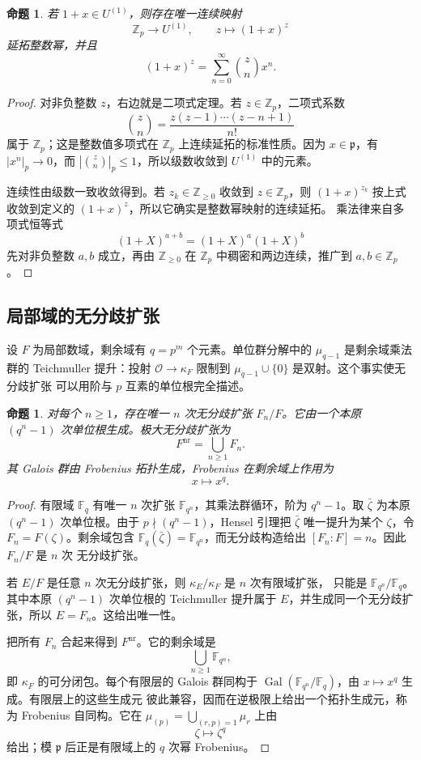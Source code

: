 \documentclass[11pt,a4paper,openany]{ctexbook}
\numberwithin{equation}{chapter}
\newcommand{\Z}{\mathbb{Z}}
\newcommand{\F}{\mathbb{F}}
\theoremstyle{plain}
\newtheorem{proposition}[theorem]{命题}
\theoremstyle{definition}
\theoremstyle{remark}
\begin{document}
\begin{proposition}
若 $1+x\in U^{(1)}$，则存在唯一连续映射
\[
\Z_p\longrightarrow U^{(1)},\qquad z\longmapsto (1+x)^z
\]
延拓整数幂，并且
\[
(1+x)^z=\sum_{n=0}^\infty \binom{z}{n}x^n.
\]
\end{proposition}

\begin{proof}
对非负整数 $z$，右边就是二项式定理。若 $z\in\Z_p$，二项式系数
\[
\binom{z}{n}=\frac{z(z-1)\cdots(z-n+1)}{n!}
\]
属于 $\Z_p$；这是整数值多项式在 $\Z_p$ 上连续延拓的标准性质。因为
$x\in\mathfrak p$，有 $|x^n|_p\to0$，而 $|\binom{z}{n}|_p\le1$，所以级数收敛到
$U^{(1)}$ 中的元素。

连续性由级数一致收敛得到。若 $z_k\in\Z_{\ge0}$ 收敛到 $z\in\Z_p$，则
$(1+x)^{z_k}$ 按上式收敛到定义的 $(1+x)^z$，所以它确实是整数幂映射的连续延拓。
乘法律来自多项式恒等式
\[
(1+X)^{a+b}=(1+X)^a(1+X)^b
\]
先对非负整数 $a,b$ 成立，再由 $\Z_{\ge0}$ 在 $\Z_p$ 中稠密和两边连续，推广到
$a,b\in\Z_p$。
\end{proof}

\subsection{局部域的无分歧扩张}

设 $F$ 为局部数域，剩余域有 $q=p^m$ 个元素。单位群分解中的
$\mu_{q-1}$ 是剩余域乘法群的 Teichmuller 提升：投射
$\mathcal O\to\kappa_F$ 限制到 $\mu_{q-1}\cup\{0\}$ 是双射。这个事实使无分歧扩张
可以用阶与 $p$ 互素的单位根完全描述。

\begin{proposition}
对每个 $n\ge1$，存在唯一 $n$ 次无分歧扩张 $F_n/F$。它由一个本原 $(q^n-1)$ 次单位根生成。极大无分歧扩张为
\[
F^{\mathrm{nr}}=\bigcup_{n\ge1}F_n.
\]
其 Galois 群由 Frobenius 拓扑生成，Frobenius 在剩余域上作用为
\[
x\longmapsto x^q.
\]
\end{proposition}

\begin{proof}
有限域 $\F_q$ 有唯一 $n$ 次扩张 $\F_{q^n}$，其乘法群循环，阶为 $q^n-1$。取
$\bar\zeta$ 为本原 $(q^n-1)$ 次单位根。由于 $p\nmid(q^n-1)$，Hensel 引理把
$\bar\zeta$ 唯一提升为某个 $\zeta$，令 $F_n=F(\zeta)$。剩余域包含
$\F_q(\bar\zeta)=\F_{q^n}$，而无分歧构造给出 $[F_n:F]=n$。因此 $F_n/F$ 是 $n$ 次
无分歧扩张。

若 $E/F$ 是任意 $n$ 次无分歧扩张，则 $\kappa_E/\kappa_F$ 是 $n$ 次有限域扩张，
只能是 $\F_{q^n}/\F_q$。其中本原 $(q^n-1)$ 次单位根的 Teichmuller 提升属于
$E$，并生成同一个无分歧扩张，所以 $E=F_n$。这给出唯一性。

把所有 $F_n$ 合起来得到 $F^{\mathrm{nr}}$。它的剩余域是
\[
\bigcup_{n\ge1}\F_{q^n},
\]
即 $\kappa_F$ 的可分闭包。每个有限层的 Galois 群同构于
$\operatorname{Gal}(\F_{q^n}/\F_q)$，由 $x\mapsto x^q$ 生成。有限层上的这些生成元
彼此兼容，因而在逆极限上给出一个拓扑生成元，称为 Frobenius 自同构。它在
$\mu_{(p)}=\bigcup_{(r,p)=1}\mu_r$ 上由
\[
\zeta\longmapsto \zeta^q
\]
给出；模 $\mathfrak p$ 后正是有限域上的 $q$ 次幂 Frobenius。
\end{proof}
\end{document}
